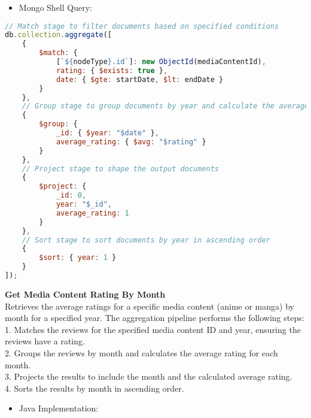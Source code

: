 \begin{itemize}
    \item Mongo Shell Query:
\end{itemize}
\begin{lstlisting}[language=JavaScript]
// Match stage to filter documents based on specified conditions
db.collection.aggregate([
    {
        $match: {
            [`${nodeType}.id`]: new ObjectId(mediaContentId),
            rating: { $exists: true },
            date: { $gte: startDate, $lt: endDate }
        }
    },
    // Group stage to group documents by year and calculate the average rating
    {
        $group: {
            _id: { $year: "$date" },
            average_rating: { $avg: "$rating" }
        }
    },
    // Project stage to shape the output documents
    {
        $project: {
            _id: 0,
            year: "$_id",
            average_rating: 1
        }
    },
    // Sort stage to sort documents by year in ascending order
    {
        $sort: { year: 1 }
    }
]);
\end{lstlisting}
\textbf{Get Media Content Rating By Month}\\
Retrieves the average ratings for a specific media content (anime or manga) by month for a specified year.
The aggregation pipeline performs the following steps:\\
1. Matches the reviews for the specified media content ID and year, ensuring the reviews have a rating.\\
2. Groups the reviews by month and calculates the average rating for each month.\\
3. Projects the results to include the month and the calculated average rating.\\
4. Sorts the results by month in ascending order.
\begin{itemize}
    \item Java Implementation:
\end{itemize}
